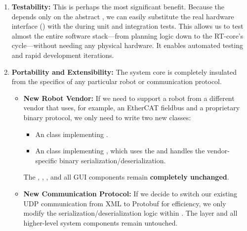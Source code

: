 \begin{enumerate}
    \item \textbf{Testability:} This is perhaps the most significant benefit. Because the  depends only on the abstract , we can easily substitute the real hardware interface () with the  during unit and integration tests. This allows us to test almost the entire software stack—from planning logic down to the RT-core's cycle—without needing any physical hardware. It enables automated testing and rapid development iterations.
    
    \item \textbf{Portability and Extensibility:} The system core is completely insulated from the specifics of any particular robot or communication protocol.
    \begin{itemize}
        \item \textbf{New Robot Vendor:} If we need to support a robot from a different vendor that uses, for example, an EtherCAT fieldbus and a proprietary binary protocol, we only need to write two new classes:
            \begin{itemize}
                \item An  class implementing .
                \item An  class implementing , which uses the  and handles the vendor-specific binary serialization/deserialization.
            \end{itemize}
            The , , , and all GUI components remain \textbf{completely unchanged}.
        \item \textbf{New Communication Protocol:} If we decide to switch our existing UDP communication from XML to Protobuf for efficiency, we only modify the serialization/deserialization logic within . The  layer and all higher-level system components remain untouched.
    \end{itemize}
    

\end{enumerate}
